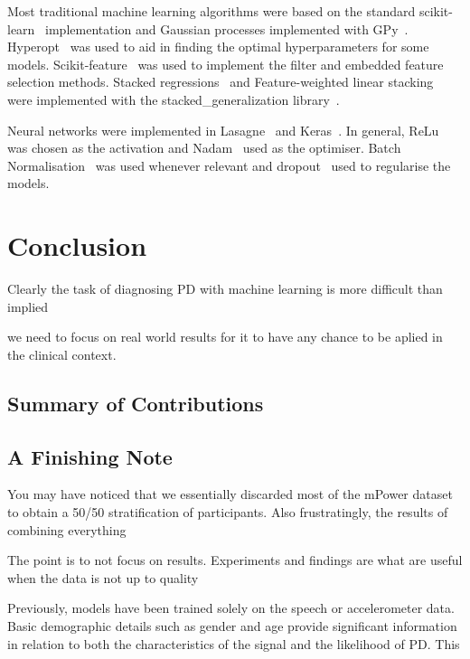 \documentclass[12pt, twoside]{book}
\begin{document}
Most traditional machine learning algorithms were based on the standard scikit-learn~\cite{scikitlearn} implementation and Gaussian processes implemented with GPy~\cite{gpy2014}. Hyperopt~\cite{hyperopt} was used to aid in finding the optimal hyperparameters for some models. Scikit-feature~\cite{skfeature} was used to implement the filter and embedded feature selection methods. Stacked regressions~\cite{stackregression} and Feature-weighted linear stacking~\cite{fwls} were implemented with the stacked\_generalization library~\cite{stackedgeneralizaton}.

Neural networks were implemented in Lasagne~\cite{lasagne} and Keras~\cite{keras}. In general, ReLu~\cite{relu} was chosen as the activation and Nadam~\cite{nadam} used as the optimiser. Batch Normalisation~\cite{batchnorm} was used whenever relevant and dropout~\cite{dropout} used to regularise the models. 



\chapter{Conclusion}
Clearly the task of diagnosing PD with machine learning is more difficult than implied

we need to focus on real world results for it to have any chance to be aplied in the clinical context.



\section{Summary of Contributions}


\section{A Finishing Note}
You may have noticed that we essentially discarded most of the mPower dataset to obtain a 50/50 stratification of participants. Also frustratingly, the results of combining everything 

The point is to not focus on results. Experiments and findings are what are useful when the data is not up to quality 

Previously, models have been trained solely on the speech or accelerometer data. Basic demographic details such as gender and age provide significant information in relation to both the characteristics of the signal and the likelihood of PD. This 


\backmatter


\end{document}
